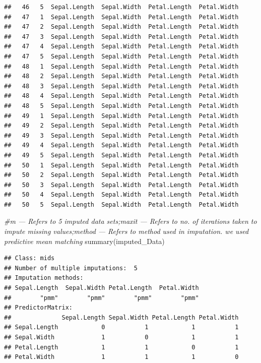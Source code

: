 \documentclass[
]{book}
\newenvironment{Shaded}{\begin{snugshade}}{\end{snugshade}}
\newcommand{\CommentTok}[1]{\textcolor[rgb]{0.56,0.35,0.01}{\textit{#1}}}
\newcommand{\FunctionTok}[1]{\textcolor[rgb]{0.00,0.00,0.00}{#1}}
\newcommand{\NormalTok}[1]{#1}
\begin{document}
\begin{verbatim}
##   46   5  Sepal.Length  Sepal.Width  Petal.Length  Petal.Width
##   47   1  Sepal.Length  Sepal.Width  Petal.Length  Petal.Width
##   47   2  Sepal.Length  Sepal.Width  Petal.Length  Petal.Width
##   47   3  Sepal.Length  Sepal.Width  Petal.Length  Petal.Width
##   47   4  Sepal.Length  Sepal.Width  Petal.Length  Petal.Width
##   47   5  Sepal.Length  Sepal.Width  Petal.Length  Petal.Width
##   48   1  Sepal.Length  Sepal.Width  Petal.Length  Petal.Width
##   48   2  Sepal.Length  Sepal.Width  Petal.Length  Petal.Width
##   48   3  Sepal.Length  Sepal.Width  Petal.Length  Petal.Width
##   48   4  Sepal.Length  Sepal.Width  Petal.Length  Petal.Width
##   48   5  Sepal.Length  Sepal.Width  Petal.Length  Petal.Width
##   49   1  Sepal.Length  Sepal.Width  Petal.Length  Petal.Width
##   49   2  Sepal.Length  Sepal.Width  Petal.Length  Petal.Width
##   49   3  Sepal.Length  Sepal.Width  Petal.Length  Petal.Width
##   49   4  Sepal.Length  Sepal.Width  Petal.Length  Petal.Width
##   49   5  Sepal.Length  Sepal.Width  Petal.Length  Petal.Width
##   50   1  Sepal.Length  Sepal.Width  Petal.Length  Petal.Width
##   50   2  Sepal.Length  Sepal.Width  Petal.Length  Petal.Width
##   50   3  Sepal.Length  Sepal.Width  Petal.Length  Petal.Width
##   50   4  Sepal.Length  Sepal.Width  Petal.Length  Petal.Width
##   50   5  Sepal.Length  Sepal.Width  Petal.Length  Petal.Width
\end{verbatim}

\begin{Shaded}
\begin{Highlighting}[]
\CommentTok{\#m — Refers to 5 imputed data sets;maxit — Refers to no. of iterations taken to impute missing values;method — Refers to method used in imputation. we used predictive mean matching}
\FunctionTok{summary}\NormalTok{(imputed\_Data)}
\end{Highlighting}
\end{Shaded}

\begin{verbatim}
## Class: mids
## Number of multiple imputations:  5 
## Imputation methods:
## Sepal.Length  Sepal.Width Petal.Length  Petal.Width 
##        "pmm"        "pmm"        "pmm"        "pmm" 
## PredictorMatrix:
##              Sepal.Length Sepal.Width Petal.Length Petal.Width
## Sepal.Length            0           1            1           1
## Sepal.Width             1           0            1           1
## Petal.Length            1           1            0           1
## Petal.Width             1           1            1           0
\end{verbatim}
\end{document}
